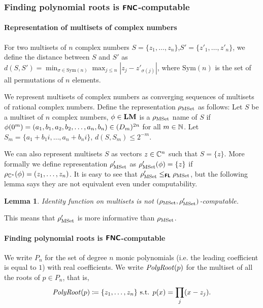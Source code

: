 \documentclass{article}
\newtheorem{lemma}[theorem]{Lemma}
\theoremstyle{definition}
\theoremstyle{remark}
\begin{document}
\subsubsection{Finding polynomial roots is \texorpdfstring{$\text{\bfseries \sffamily \upshape FNC}$}{FNC}-computable}

\paragraph{Representation of multisets of complex numbers}

For two multisets of $n$ complex numbers $S = \{z_1, \dots, z_n\}$,$S' = \{z'_1, \dots, z'_n\}$,
we define the distance between $S$ and $S'$ as
$d(S, S') = \min_{\sigma \in \mathrm{Sym}(n)} \max_{j \le n}|z_j - z'_{\sigma(j)}|$,
where $\mathrm{Sym}(n)$ is the set of all permutations of $n$ elements.

We represent multisets of complex numbers as converging sequences of 
multisets of rational complex numbers.
Define the representation $\rho_{\mathrm{MSet}}$ as follows:
Let $S$ be a multiset of $n$ complex numbers,
$\phi \in \mathbf{LM}$ is a $\rho_{\mathrm{MSet}}$ name of $S$ if
$\phi(0^m) = ( a_1, b_1, a_2, b_2, \dots, a_n, b_n ) \in (D_m)^{2n}$
for all $m \in \mathbb N$.
Let $S_m = \{a_1+b_1 i, \dots, a_n+b_n i\}$, 
$d(S, S_m) \le 2^{-m}$.

We can also represent multisets $S$ as vectors $z \in \mathbb C^n$
such that $S = \{z\}$.
More formally we define representation $\rho_{\mathrm{MSet}}'$ as
$\rho_{\mathrm{MSet}}'(\phi) = \{z\}$ if $\rho_{\mathbb C^*}(\phi) = (z_1, \dots, z_n)$.
It is easy to see that $\rho_{\mathrm{MSet}}' \le_{\text{\bfseries \sffamily \upshape FL}} \rho_{\mathrm{MSet}}$,
but the following lemma says they are not equivalent even under computability.
\begin{lemma}
 Identity function on multisets is not $(\rho_{\mathrm{MSet}}, \rho_{\mathrm{MSet}}')$-computable.
\end{lemma}
This means that $\rho_{\mathrm{MSet}}'$ is more informative than $\rho_{\mathrm{MSet}}$.



\paragraph{Finding polynomial roots is $\text{\bfseries \sffamily \upshape FNC}$-computable}

We write $P_n$ for the set of degree $n$ monic 
polynomials (i.e. the leading coefficient is equal to $1$) with real coefficients.
We write $\mathit{PolyRoot}(p)$ for the multiset of all the roots of $p \in P_n$, that is,
\begin{equation}
 \mathit{PolyRoot}(p) \coloneqq \{ z_1, \dots, z_n \} \text{ s.t. } p(x) = \prod_j (x - z_j).
\end{equation}
\end{document}
